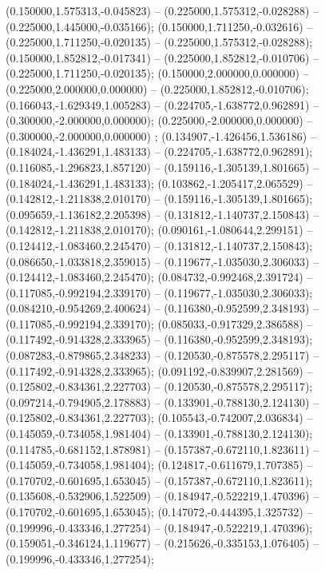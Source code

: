  (0.150000,1.575313,-0.045823) -- (0.225000,1.575312,-0.028288) -- (0.225000,1.445000,-0.035166);
 (0.150000,1.711250,-0.032616) -- (0.225000,1.711250,-0.020135) -- (0.225000,1.575312,-0.028288);
 (0.150000,1.852812,-0.017341) -- (0.225000,1.852812,-0.010706) -- (0.225000,1.711250,-0.020135);
 (0.150000,2.000000,0.000000) -- (0.225000,2.000000,0.000000) -- (0.225000,1.852812,-0.010706);
 (0.166043,-1.629349,1.005283) -- (0.224705,-1.638772,0.962891) -- (0.300000,-2.000000,0.000000);
 (0.225000,-2.000000,0.000000) -- (0.300000,-2.000000,0.000000) ;
 (0.134907,-1.426456,1.536186) -- (0.184024,-1.436291,1.483133) -- (0.224705,-1.638772,0.962891);
 (0.116085,-1.296823,1.857120) -- (0.159116,-1.305139,1.801665) -- (0.184024,-1.436291,1.483133);
 (0.103862,-1.205417,2.065529) -- (0.142812,-1.211838,2.010170) -- (0.159116,-1.305139,1.801665);
 (0.095659,-1.136182,2.205398) -- (0.131812,-1.140737,2.150843) -- (0.142812,-1.211838,2.010170);
 (0.090161,-1.080644,2.299151) -- (0.124412,-1.083460,2.245470) -- (0.131812,-1.140737,2.150843);
 (0.086650,-1.033818,2.359015) -- (0.119677,-1.035030,2.306033) -- (0.124412,-1.083460,2.245470);
 (0.084732,-0.992468,2.391724) -- (0.117085,-0.992194,2.339170) -- (0.119677,-1.035030,2.306033);
 (0.084210,-0.954269,2.400624) -- (0.116380,-0.952599,2.348193) -- (0.117085,-0.992194,2.339170);
 (0.085033,-0.917329,2.386588) -- (0.117492,-0.914328,2.333965) -- (0.116380,-0.952599,2.348193);
 (0.087283,-0.879865,2.348233) -- (0.120530,-0.875578,2.295117) -- (0.117492,-0.914328,2.333965);
 (0.091192,-0.839907,2.281569) -- (0.125802,-0.834361,2.227703) -- (0.120530,-0.875578,2.295117);
 (0.097214,-0.794905,2.178883) -- (0.133901,-0.788130,2.124130) -- (0.125802,-0.834361,2.227703);
 (0.105543,-0.742007,2.036834) -- (0.145059,-0.734058,1.981404) -- (0.133901,-0.788130,2.124130);
 (0.114785,-0.681152,1.878981) -- (0.157387,-0.672110,1.823611) -- (0.145059,-0.734058,1.981404);
 (0.124817,-0.611679,1.707385) -- (0.170702,-0.601695,1.653045) -- (0.157387,-0.672110,1.823611);
 (0.135608,-0.532906,1.522509) -- (0.184947,-0.522219,1.470396) -- (0.170702,-0.601695,1.653045);
 (0.147072,-0.444395,1.325732) -- (0.199996,-0.433346,1.277254) -- (0.184947,-0.522219,1.470396);
 (0.159051,-0.346124,1.119677) -- (0.215626,-0.335153,1.076405) -- (0.199996,-0.433346,1.277254);
